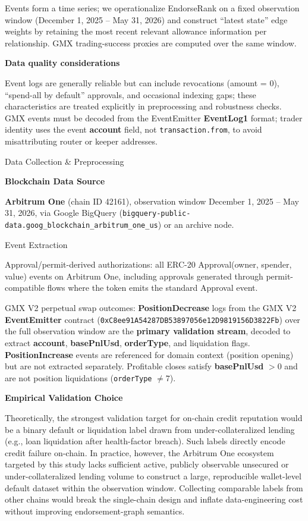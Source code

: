 Events form a time series; we operationalize EndorseRank on a fixed observation window (December 1, 2025 -- May 31, 2026) and construct ``latest state'' edge weights by retaining the most recent relevant allowance information per relationship. GMX trading-success proxies are computed over the same window.


\textbf{Data quality considerations}


Event logs are generally reliable but can include revocations (amount = 0), ``spend-all by default'' approvals, and occasional indexing gaps; these characteristics are treated explicitly in preprocessing and robustness checks. GMX events must be decoded from the EventEmitter \textbf{EventLog1} format; trader identity uses the event \textbf{account} field, not \texttt{transaction.from}, to avoid misattributing router or keeper addresses.


Data Collection \& Preprocessing


\textbf{Blockchain Data Source}


\textbf{Arbitrum One} (chain ID 42161), observation window December 1, 2025 -- May 31, 2026, via Google BigQuery (\texttt{bigquery-public-data.goog\_blockchain\_arbitrum\_one\_us}) or an archive node.


Event Extraction


Approval/permit-derived authorizations: all ERC-20 Approval(owner, spender, value) events on Arbitrum One, including approvals generated through permit-compatible flows where the token emits the standard Approval event.


GMX V2 perpetual swap outcomes: \textbf{PositionDecrease} logs from the GMX V2 \textbf{EventEmitter} contract (\texttt{0xC8ee91A54287DB53897056e12D9819156D3822Fb}) over the full observation window are the \textbf{primary validation stream}, decoded to extract \textbf{account}, \textbf{basePnlUsd}, \textbf{orderType}, and liquidation flags. \textbf{PositionIncrease} events are referenced for domain context (position opening) but are not extracted separately. Profitable closes satisfy \textbf{basePnlUsd} $> 0$ and are not position liquidations (\texttt{orderType} $\neq 7$).


\textbf{Empirical Validation Choice}


Theoretically, the strongest validation target for on-chain credit reputation would be a binary default or liquidation label drawn from under-collateralized lending (e.g., loan liquidation after health-factor breach). Such labels directly encode credit failure on-chain. In practice, however, the Arbitrum One ecosystem targeted by this study lacks sufficient active, publicly observable unsecured or under-collateralized lending volume to construct a large, reproducible wallet-level default dataset within the observation window. Collecting comparable labels from other chains would break the single-chain design and inflate data-engineering cost without improving endorsement-graph semantics.


